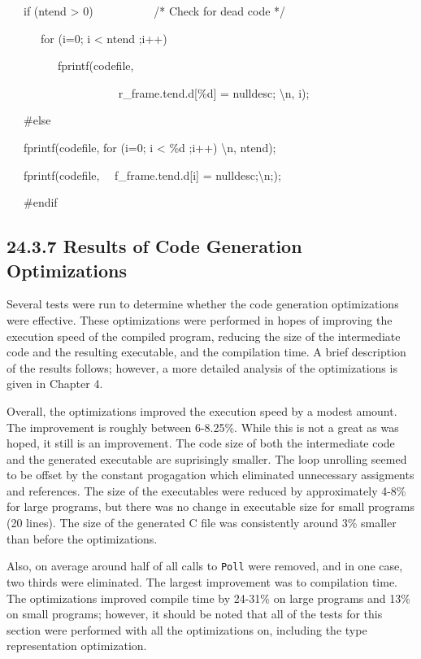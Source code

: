 {\ttfamily\mdseries
\ \ \ if (ntend {\textgreater} 0) \ \ \ \ \ \ \ \ \ \ /* Check for dead code */}

{\ttfamily\mdseries
\ \ \ \ \ \ for (i=0; i {\textless} ntend ;i++)}

{\ttfamily\mdseries
\ \ \ \ \ \ \ \ \ fprintf(codefile,}

{\ttfamily\mdseries
\ \ \ \ \ \ \ \ \ \ \ \ \ \ \ \ \ {\textquotedbl} \ \ r\_frame.tend.d[\%d] = nulldesc; {\textbackslash}n{\textquotedbl},
i);}

{\ttfamily\mdseries
\ \ \ \#else}

{\ttfamily\mdseries
\ \ \ fprintf(codefile, {\textquotedbl}for (i=0; i {\textless} \%d ;i++) {\textbackslash}n{\textquotedbl}, ntend);}

{\ttfamily\mdseries
\ \ \ fprintf(codefile, {\textquotedbl} \ \ f\_frame.tend.d[i] = nulldesc;{\textbackslash}n;{\textquotedbl});}

{\ttfamily\mdseries
\ \ \ \#endif}

\subsection[24.3.7 Results of Code Generation Optimizations]{24.3.7 Results of Code Generation Optimizations}

Several tests were run to determine whether the code generation
optimizations were effective. These optimizations were performed in
hopes of improving the execution speed of the compiled program,
reducing the size of the intermediate code and the resulting
executable, and the compilation time. A brief description of the
results follows; however, a more detailed analysis of the
optimizations is given in Chapter 4.


Overall, the optimizations improved the execution speed by a modest
amount. The improvement is roughly between 6-8.25\%.  While this is
not a great as was hoped, it still is an improvement. The code size of
both the intermediate code and the generated executable are
suprisingly smaller. The loop unrolling seemed to be offset by the
constant progagation which eliminated unnecessary assigments and
references. The size of the executables were reduced by approximately
4-8\% for large programs, but there was no change in executable size
for small programs (20 lines). The size of the generated C file was
consistently around 3\% smaller than before the optimizations.


Also, on average around half of all calls to \texttt{Poll} were
removed, and in one case, two thirds were eliminated.  The largest
improvement was to compilation time. The optimizations improved
compile time by 24-31\% on large programs and 13\% on small programs;
however, it should be noted that all of the tests for this section
were performed with all the optimizations on, including the type
representation optimization.

